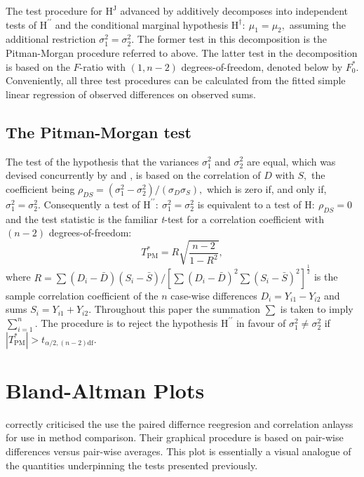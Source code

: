 \documentclass[12pt, a4paper]{report}
\theoremstyle{plain}
\theoremstyle{definition}
\theoremstyle{remark}
\begin{document}
The test procedure for $\textrm{H}^\mathrm{J}$ advanced by \citet{BB89} additively decomposes into independent tests of $\textrm{H}^{\prime\prime}$ and the conditional marginal hypothesis $\textrm{H}^\dag\colon~\mu_1 = \mu_2,$ assuming the additional restriction $\sigma^2_1 = \sigma^2_2.$  The former test in this decomposition is the Pitman-Morgan procedure referred to above. The latter test in the decomposition is based on the $F$-ratio with $(1,n-2)$ degrees-of-freedom, denoted below by $F_0^\ast.$ Conveniently, all three test procedures can be calculated from the fitted simple linear regression of observed differences on observed sums. 



\subsection{The Pitman-Morgan test}

The test of the hypothesis that the variances $\sigma^2_1$ and $\sigma^2_2$ are equal, which was devised concurrently by \cite{pitman} and \cite{morgan}, is based on the correlation of $D$ with $S,$ the coefficient being $\rho_{DS} = (\sigma^2_1 - \sigma^2_2) / (\sigma_D \sigma_S ),$ which is zero if, and only if, $\sigma^2_1 = \sigma^2_2.$ Consequently a test of $\textrm{H}^{\prime\prime}\colon\ \sigma^2_1 = \sigma^2_2$ is equivalent to a test of $\textrm{H}\colon\ \rho_{DS}=0$ and the test statistic is the familiar {\it t}-test for a correlation coefficient with $(n-2)$ degrees-of-freedom:  
\[
T^*_\mathrm{PM} = R \sqrt{ \frac{n-2}{1-R^2} },
\]
where $R =  \sum (D_i-\bar{D})(S_i-\bar{S}) / [ \sum(D_i-\bar{D})^2 \sum (S_i-\bar{S})^2 ]^{\frac{1}{2}} $ 
is the sample correlation coefficient of the $n$ case-wise differences $D_i = Y_{i1} - Y_{i2}$ and sums $S_i = Y_{i1} + Y_{i2}.$ Throughout this paper the summation $\sum$ is taken to imply $\sum_{i=1}^n.$  The procedure is to reject the hypothesis $\textrm{H}^{\prime\prime}$ in favour of $\sigma^2_1\neq\sigma^2_2$ if $|T^*_\mathrm{PM}| >  t_{\alpha/2,(n-2)\textrm{df}}.$ 




\section*{Bland-Altman Plots}

\citet{BA83} correctly criticised the use the paired differnce reegresion and correlation anlayss for use in method comparison. Their graphical procedure is based on pair-wise differences versus pair-wise averages. This plot is essentially a visual analogue of the quantities underpinning the tests presented previously.
\end{document}
